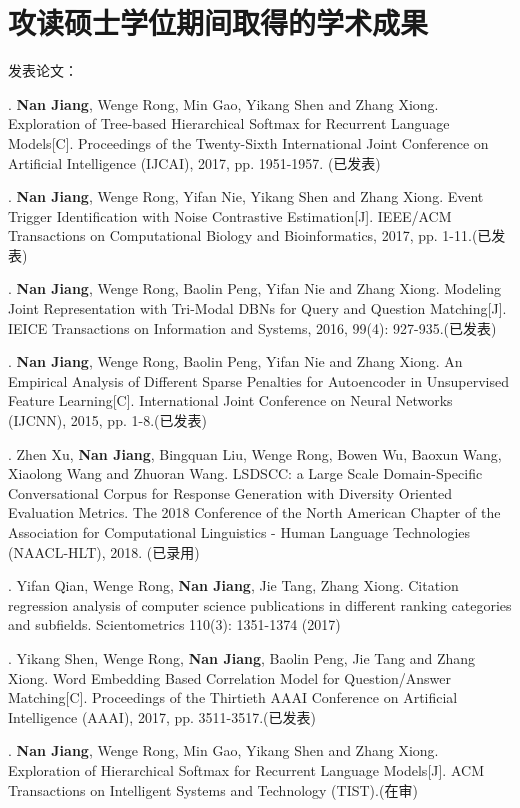 \chapter{攻读硕士学位期间取得的学术成果}
\noindent 发表论文：

. \textbf{Nan Jiang}, Wenge Rong, Min Gao, Yikang Shen and Zhang Xiong. Exploration of Tree-based Hierarchical Softmax for Recurrent Language Models[C]. Proceedings of the Twenty-Sixth International Joint Conference on Artificial Intelligence (IJCAI), 2017, pp. 1951-1957. (已发表)

. \textbf{Nan Jiang}, Wenge Rong, Yifan Nie, Yikang Shen and Zhang Xiong. Event Trigger Identification with Noise Contrastive Estimation[J]. IEEE/ACM Transactions on Computational Biology and Bioinformatics, 2017, pp. 1-11.(已发表)

. \textbf{Nan Jiang}, Wenge Rong, Baolin Peng, Yifan Nie and Zhang Xiong. Modeling Joint Representation with Tri-Modal DBNs for Query and Question Matching[J]. IEICE Transactions on Information and Systems, 2016, 99(4): 927-935.(已发表)

. \textbf{Nan Jiang}, Wenge Rong, Baolin Peng, Yifan Nie and Zhang Xiong. An Empirical Analysis of Different Sparse Penalties
for Autoencoder in Unsupervised Feature Learning[C]. International Joint Conference on Neural Networks (IJCNN), 2015, pp. 1-8.(已发表)

. Zhen Xu, \textbf{Nan Jiang}, Bingquan Liu, Wenge Rong, Bowen Wu, Baoxun Wang, Xiaolong Wang and Zhuoran Wang. LSDSCC: a Large Scale Domain-Specific Conversational Corpus for Response Generation with Diversity Oriented Evaluation Metrics. The 2018 Conference of the North American Chapter of the Association for Computational Linguistics - Human Language Technologies (NAACL-HLT), 2018. (已录用)

. Yifan Qian, Wenge Rong, \textbf{Nan Jiang}, Jie Tang, Zhang Xiong. Citation regression analysis of computer science publications in different ranking categories and subfields. Scientometrics 110(3): 1351-1374 (2017)

. Yikang Shen, Wenge Rong, \textbf{Nan Jiang}, Baolin Peng, Jie Tang and Zhang Xiong. Word Embedding Based Correlation Model for Question/Answer Matching[C]. Proceedings of the Thirtieth {AAAI} Conference on Artificial Intelligence (AAAI), 2017, pp. 3511-3517.(已发表)

. \textbf{Nan Jiang}, Wenge Rong, Min Gao, Yikang Shen and Zhang Xiong. Exploration of Hierarchical Softmax for Recurrent Language Models[J]. ACM Transactions on Intelligent Systems and Technology (TIST).(在审)

